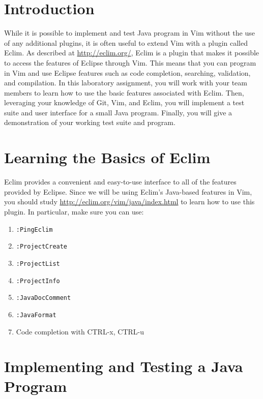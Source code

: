 

\usepackage[compact]{titlesec}



\section*{Introduction}

While it is possible to implement and test Java program in Vim without the use of any additional plugins, it is often
useful to extend Vim with a plugin called Eclim.  As described at \url{http://eclim.org/}, Eclim is a plugin that makes
it possible to access the features of Eclipse through Vim.  This means that you can program in Vim and use Eclipse
features such as code completion, searching, validation, and compilation. In this laboratory assignment, you will work
with your team members to learn how to use the basic features associated with Eclim.  Then, leveraging your knowledge of
Git, Vim, and Eclim, you will implement a test suite and user interface for a small Java program.  Finally, you will 
give a demonstration of your working test suite and program.

\section*{Learning the Basics of Eclim}

Eclim provides a convenient and easy-to-use interface to all of the features provided by Eclipse.  Since we will be
using Eclim's Java-based features in Vim, you should study \url{http://eclim.org/vim/java/index.html} to learn how to
use this plugin.  In particular, make sure you can use:

\begin{enumerate}
	\item {\tt :PingEclim}
	\item {\tt :ProjectCreate}
	\item {\tt :ProjectList}
	\item {\tt :ProjectInfo}
	\item {\tt :JavaDocComment}
	\item {\tt :JavaFormat}
	\item Code completion with CTRL-x, CTRL-u 
\end{enumerate}

\section*{Implementing and Testing a Java Program}


